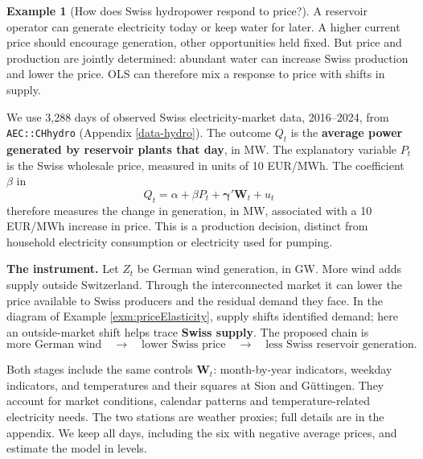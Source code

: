 \documentclass[
  11pt,
]{book}
\theoremstyle{definition}
\theoremstyle{definition}
\newtheorem{example}{Example}[chapter]
\theoremstyle{definition}
\theoremstyle{definition}
\theoremstyle{remark}
\begin{document}
\begin{example}[How does Swiss hydropower respond to price?]
\protect\hypertarget{exm:IVhydro}{}\label{exm:IVhydro}A reservoir operator can generate electricity today or keep water for later. A higher current price should encourage generation, other opportunities held fixed. But price and production are jointly determined: abundant water can increase Swiss production and lower the price. OLS can therefore mix a response to price with shifts in supply.

We use 3,288 days of observed Swiss electricity-market data, 2016--2024, from \texttt{AEC::CHhydro} (Appendix \ref{data-hydro}). The outcome \(Q_t\) is the \textbf{average power generated by reservoir plants that day}, in MW. The explanatory variable \(P_t\) is the Swiss wholesale price, measured in units of 10 EUR/MWh. The coefficient \(\beta\) in
\[
 Q_t=\alpha+\beta P_t+\boldsymbol\gamma'\mathbf{W}_t+u_t
\]
therefore measures the change in generation, in MW, associated with a 10 EUR/MWh increase in price. This is a production decision, distinct from household electricity consumption or electricity used for pumping.

\textbf{The instrument.} Let \(Z_t\) be German wind generation, in GW. More wind adds supply outside Switzerland. Through the interconnected market it can lower the price available to Swiss producers and the residual demand they face. In the diagram of Example \ref{exm:priceElasticity}, supply shifts identified demand; here an outside-market shift helps trace \textbf{Swiss supply}. The proposed chain is
\[
 \text{more German wind}\quad\longrightarrow\quad
 \text{lower Swiss price}\quad\longrightarrow\quad
 \text{less Swiss reservoir generation}.
\]

Both stages include the same controls \(\mathbf{W}_t\): month-by-year indicators, weekday indicators, and temperatures and their squares at Sion and Güttingen. They account for market conditions, calendar patterns and temperature-related electricity needs. The two stations are weather proxies; full details are in the appendix. We keep all days, including the six with negative average prices, and estimate the model in levels.

\begin{table}[H]
\centering\begingroup\fontsize{10}{12}\selectfont

\endgroup{}
\end{table}


\end{example}
\end{document}

